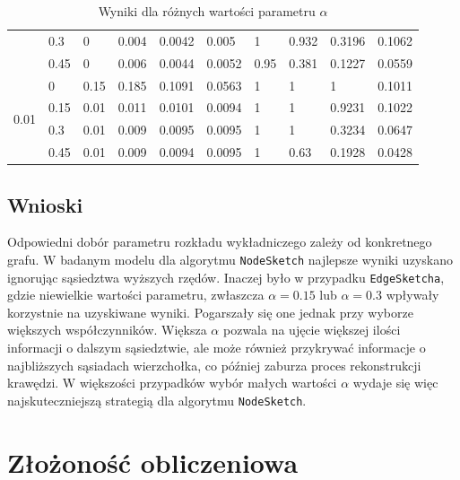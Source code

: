 \begin{table}[!ht]
\begin{tabular}{|l|l|l|l|l|l|l|l|l|l|}
            & 0.3 & 0 & 0.004 & 0.0042 & 0.005 & 1 & 0.932 & 0.3196 & 0.1062 \\ \cline{2-10}
            & 0.45 & 0 & 0.006 & 0.0044 & 0.0052 & 0.95 & 0.381 & 0.1227 & 0.0559 \\ \hline\hline
        \multirow{4}{*}{0.01}    & 0 & 0.15 & 0.185 & 0.1091 & 0.0563 & 1 & 1 & 1 & 0.1011 \\ \cline{2-10}
            & 0.15 & 0.01 & 0.011 & 0.0101 & 0.0094 & 1 & 1 & 0.9231 & 0.1022 \\ \cline{2-10}
            & 0.3 & 0.01 & 0.009 & 0.0095 & 0.0095 & 1 & 1 & 0.3234 & 0.0647 \\ \cline{2-10}
            & 0.45 & 0.01 & 0.009 & 0.0094 & 0.0095 & 1 & 0.63 & 0.1928 & 0.0428 \\ \hline
        \end{tabular}
        \caption{Wyniki dla różnych wartości parametru $\alpha$}
        \label{tab:alpha}
    \end{table}

    \subsection{Wnioski}
    Odpowiedni dobór parametru rozkładu wykładniczego zależy od konkretnego grafu. W badanym modelu dla algorytmu \texttt{NodeSketch} najlepsze wyniki uzyskano ignorując sąsiedztwa wyższych rzędów. Inaczej było w przypadku \texttt{EdgeSketcha}, gdzie niewielkie wartości parametru, zwłaszcza $\alpha = 0.15$ lub $\alpha = 0.3$ wpływały korzystnie na uzyskiwane wyniki. Pogarszały się one jednak przy wyborze większych współczynników. Większa $\alpha$ pozwala na ujęcie większej ilości informacji o dalszym sąsiedztwie, ale może również przykrywać informacje o najbliższych sąsiadach wierzchołka, co później zaburza proces rekonstrukcji krawędzi. W większości przypadków wybór małych wartości $\alpha$ wydaje się więc najskuteczniejszą strategią dla algorytmu \texttt{NodeSketch}. 

\section{Złożoność obliczeniowa}
\label{sec:performance}


